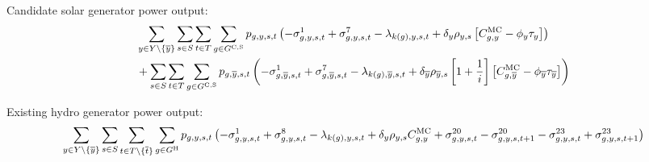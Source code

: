 \documentclass{article}
\begin{document}
Candidate solar generator power output:
\begin{align}
	& \sum\limits_{\iYear \in \sYears 
		\setminus \{\iYearTerminal\}
	}\sum\limits_{\iScenario \in \sScenarios}\sum\limits_{\iInterval \in \sIntervals} \sum\limits_{\iGenerator \in \sGeneratorsCandidateSolar} \vPower \left(-\dMinPowerOutput + \dMaxPowerOutputSolarCandidate 
	- \dPowerBalance[k(\iGenerator),\iYear,\iScenario,\iInterval] + \cDiscountRate \cScenarioDuration \left[\cMarginalCost - \vBaseline\vPermitPrice \right]
	\right) \nonumber\\
	& + \sum\limits_{\iScenario \in \sScenarios} \sum\limits_{\iInterval \in \sIntervals} \sum\limits_{\iGenerator \in \sGeneratorsCandidateSolar} \vPower[\iGenerator,\iYearTerminal,\iScenario,\iInterval] \left(-\dMinPowerOutput[\iGenerator,\iYearTerminal,\iScenario,\iInterval] + \dMaxPowerOutputSolarCandidate[\iGenerator,\iYearTerminal,\iScenario,\iInterval] - \dPowerBalance[k(\iGenerator),\iYearTerminal,\iScenario,\iInterval] + \cDiscountRate[\iYearTerminal] \cScenarioDuration[\iYearTerminal,\iScenario] \left[1 + \frac{1}{\cInterestRate}\right] \left[\cMarginalCost[\iGenerator,\iYearTerminal] - \vBaseline[\iYearTerminal]\vPermitPrice[\iYearTerminal] \right] \right)\nonumber\\
\end{align}

Existing hydro generator power output:
\begin{equation}
\sum\limits_{\iYear \in \sYears \setminus \{\iYearTerminal\}}\sum\limits_{\iScenario \in \sScenarios} \sum\limits_{\iInterval \in \sIntervals \setminus \{\iIntervalTerminal\}} \sum\limits_{\iGenerator \in \sGeneratorsHydro} \vPower\left(-\dMinPowerOutput + \dMaxPowerOutputHydro - \dPowerBalance[k(\iGenerator),\iYear,\iScenario,\iInterval] + \cDiscountRate \cScenarioDuration\cMarginalCost + \dRampRateUp - \dRampRateUp[\iGenerator,\iYear,\iScenario,\iInterval + 1] - \dRampRateDown + \dRampRateDown[\iGenerator,\iYear,\iScenario,\iInterval + 1]
\right)
\end{equation}
\end{document}
